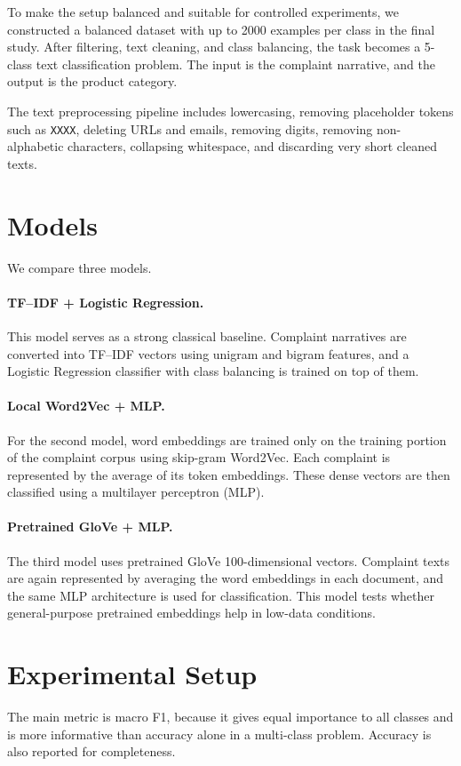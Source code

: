 \documentclass[10pt]{article}
\begin{document}
To make the setup balanced and suitable for controlled experiments, we constructed a balanced dataset with up to 2000 examples per class in the final study. After filtering, text cleaning, and class balancing, the task becomes a 5-class text classification problem. The input is the complaint narrative, and the output is the product category.

The text preprocessing pipeline includes lowercasing, removing placeholder tokens such as \texttt{XXXX}, deleting URLs and emails, removing digits, removing non-alphabetic characters, collapsing whitespace, and discarding very short cleaned texts.

\section{Models}
We compare three models.

\paragraph{TF--IDF + Logistic Regression.}
This model serves as a strong classical baseline. Complaint narratives are converted into TF--IDF vectors using unigram and bigram features, and a Logistic Regression classifier with class balancing is trained on top of them.

\paragraph{Local Word2Vec + MLP.}
For the second model, word embeddings are trained only on the training portion of the complaint corpus using skip-gram Word2Vec. Each complaint is represented by the average of its token embeddings. These dense vectors are then classified using a multilayer perceptron (MLP).

\paragraph{Pretrained GloVe + MLP.}
The third model uses pretrained GloVe 100-dimensional vectors. Complaint texts are again represented by averaging the word embeddings in each document, and the same MLP architecture is used for classification. This model tests whether general-purpose pretrained embeddings help in low-data conditions.

\section{Experimental Setup}
The main metric is macro F1, because it gives equal importance to all classes and is more informative than accuracy alone in a multi-class problem. Accuracy is also reported for completeness.
\end{document}
